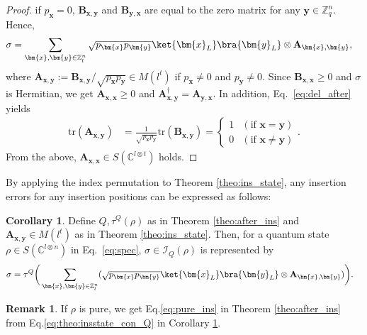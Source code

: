 \documentclass[reprint,amsmath,amssymb,aps,]{revtex4-2}
\theoremstyle{definition}
\newtheorem{coro}{Corollary}
\newtheorem{rem}{Remark}
\newcommand{\SET}[1]{\mathbb{#1}}
\newcommand{\Z}{\SET{Z}}
\newcommand{\C}{\SET{C}}
\newcommand{\1}{\mbox{1}\hspace{-0.25em}\mbox{l}}%
\newcommand{\mat}[1]{\mathbf{#1}}
\newcommand{\pure}[2]{\C^{#1 \otimes #2}}
\newcommand{\state}[2]{S(\pure{#1}{#2})}
\newcommand{\QU}[1]{\mathcal{#1}}
\begin{document}
\begin{proof}
  if $p_{ \bm{x} } = 0$,
  $\mat{B}_{\bm{x},\bm{y}}$ and $\mat{B}_{\bm{y},\bm{x}}$ are equal to
  the zero matrix
  for any $\bm{y} \in \Z_q^n$.
  Hence,
  \begin{align*}
    \sigma
    &=
    \sum_{\bm{x},\bm{y} \in \Z_{l}^{n}}
    \sqrt{ p_{\bm{x}} p_{\bm{y}} }
    \ket{\bm{x}_L}\bra{\bm{y}_L} \otimes \mat{A}_{\bm{x},\bm{y}},
  \end{align*}
  where
  $\mat{A}_{\bm{x},\bm{y}} := \mat{B}_{\bm{x},\bm{y}} / \sqrt{ p_{\bm{x}} p_{\bm{y}} } \in M(l^t)$
  if
  $p_{\bm{x}} \neq 0$ and $p_{\bm{y}} \neq 0$.
  Since $\mat{B}_{\bm{x},\bm{x}} \ge 0$ and $\sigma$ is Hermitian,
  we get
  $\mat{A}_{\bm{x},\bm{x}} \ge 0$ and
  $\mat{A}_{\bm{x},\bm{y}}^\dagger = \mat{A}_{\bm{y},\bm{x}}$. 
  In addition,
  Eq.~\eqref{eq:del_after} yields
  \begin{align*}    
    \text{tr} ( \mat{A}_{\bm{x},\bm{y}} )
    &=
    \frac{1}{ \sqrt{ p_{\bm{x}} p_{\bm{y}} } }
    \text{tr}
    \left( \mat{B}_{\bm{x},\bm{y}} \right)
    =
    \begin{cases}
      1 & (\text{if~} \bm{x} = \bm{y})\\
      0 & (\text{if~} \bm{x} \neq \bm{y})
    \end{cases}.
  \end{align*}
  From the above,
  $\mat{A}_{\bm{x},\bm{x}} \in \state{l}{t}$ holds.
\end{proof}

By applying the index permutation to Theorem \ref{theo:ins_state},
any insertion errors for any insertion positions can be
expressed as follows:
\begin{coro}
  \label{coro:ins_state}
  Define $Q, \tau^Q(\rho)$ as in Theorem \ref{theo:after_ins}
  and
  $\mat{A}_{\bm{x},\bm{y}} \in M(l^t)$ as in Theorem \ref{theo:ins_state}.
  Then,
  for a quantum state $\rho \in \state{l}{n}$ in Eq.~\eqref{eq:spec},
  $\sigma \in \QU{I}_Q(\rho)$ is represented by
  \begin{align}
    \sigma
    =
    \tau^Q
    &
    \bigg(
    \sum_{\bm{x},\bm{y} \in \Z_{l}^{n}}
    (
    \sqrt{ p_{\bm{x}} p_{\bm{y}} }
    \ket{\bm{x}_L}\bra{\bm{y}_L} \otimes \mat{A}_{\bm{x},\bm{y}}
    )
    \bigg).
    \label{eq:theo:insstate_con_Q}
  \end{align}
\end{coro}

\begin{rem}
  If $\rho$ is pure,
  we get
  Eq.\eqref{eq:pure_ins} in Theorem \ref{theo:after_ins}
  from Eq.\eqref{eq:theo:insstate_con_Q} in Corollary \ref{coro:ins_state}.
\end{rem}
\end{document}

